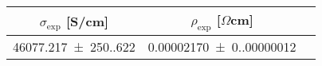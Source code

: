 \begin{tabular}{ccc}
\toprule
$\sigma_{\exp}$ [S/cm] & $\rho_{\exp}$ [$\Omega$cm] \\
\midrule
\num{46077.217(250.622)} & \num{0.00002170(0.00000012)} \\
\bottomrule
\end{tabular}

